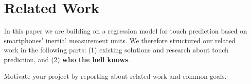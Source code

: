 \section{Related Work}
\label{sec:relw}
In this paper we are building on a regression model for touch prediction based on smartphones' inertial measurement units. 
We therefore structured our related work in the following parts: (1) existing solutions and research about touch prediction, and (2) \textbf{who the hell knows}.

Motivate your project by reporting about related work and common goals.